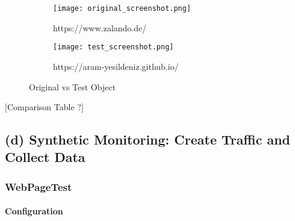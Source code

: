\begin{figure}
	\centering
	\begin{subfigure}{.5\textwidth}
		\centering
		\texttt{[image: original\_screenshot.png]}
		\caption{https://www.zalando.de/}
		\label{fig:sub1}
	\end{subfigure}%
	\begin{subfigure}{.5\textwidth}
		\centering
		\texttt{[image: test\_screenshot.png]}
		\caption{https://aram-yesildeniz.github.io/}
		\label{fig:sub2}
	\end{subfigure}
	\caption{Original vs Test Object}
	\label{figure:plt_original_test}
\end{figure}





[Comparison Table ?]





\subsection{(d) Synthetic Monitoring: Create Traffic and Collect Data}





\subsubsection{WebPageTest}





\paragraph{Configuration}

